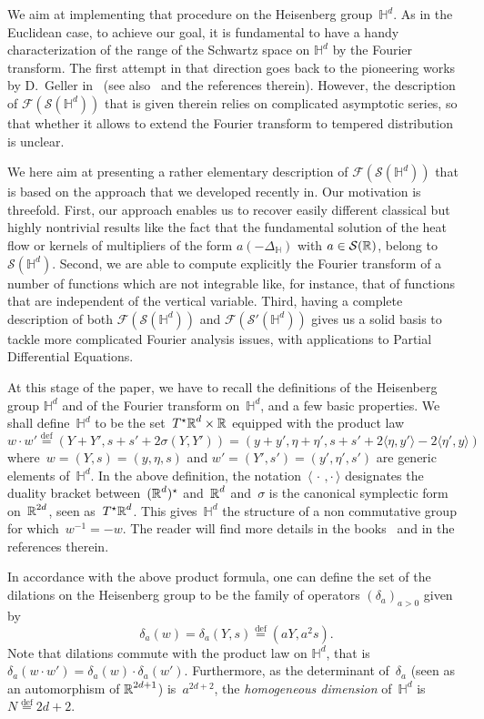 \documentclass[AHL,Unicode,longabstracts]{cedram}
\def\R{{\mathop{\mathbb R\kern 0pt}\nolimits}}
\newcommand*\bbH{\mathbb{H}}
\newcommand{\D}{\Delta}
\newcommand*\cF{\mathcal{F}}
\newcommand*\cS{\mathcal{S}}
\newcommand*\R{\mathbb{R}}
\newcommand*\bbH{\mathbb{H}}
\newcommand*\eqdefa{\overset{\mathrm{def}}{=}}
\begin{document}
We aim at implementing that procedure on the Heisenberg group~$\bbH^d$. As in the Euclidean case, to achieve our goal, it is fundamental to have a handy characterization of the range of the Schwartz space on $\bbH^d$ by the Fourier transform. The first attempt in that direction goes back to the pioneering works by D.~Geller in~\cite{geller, geller2} (see also~\cite{astengo2,F,thangavelu2} and the references therein). However, the description of $\cF(\cS(\bbH^d))$ that is given therein relies on complicated asymptotic series, so that whether it allows to extend the Fourier transform to tempered distribution is unclear.

We here aim at presenting a rather elementary description of $\cF(\cS(\bbH^d))$ that is based on the approach that we developed recently in\cite{bcdFHspace}. Our motivation is threefold. First, our approach enables us to recover easily different classical but highly nontrivial results like the fact that the fundamental solution of the heat flow or kernels of multipliers of the form $a(-\D_\bbH)$ with $a\in\cS(\R)$, belong to $\cS(\bbH^d)$. Second, we are able to compute explicitly the Fourier transform of a number of functions which are not integrable like, for instance, that of functions that are independent of the vertical variable. Third, having a complete description of both $\cF(\cS(\bbH^d))$ and $\cF(\cS'(\bbH^d))$ gives us a solid basis to tackle more complicated Fourier analysis issues, with applications to Partial Differential Equations.

At this stage of the paper, we have to recall the definitions of the Heisenberg group $\bbH^d$ and of the Fourier transform on~$\bbH^d$, and a few basic properties. We shall define~$\bbH^d$ to be the set~$T^\star\R^d \times\R$ equipped with the product law
\[
w\cdot w'\eqdefa
\left(Y+Y', s+s'+ 2\sigma(Y,Y')\right) = \left(y+y', \eta+\eta', s+s'+2 \langle \eta,y'\rangle -2\langle \eta',y\rangle\right)
\]
where~$w=(Y,s)=(y,\eta,s)$ and $w'=(Y',s')=(y',\eta',s')$ are generic elements of~$\bbH^d$. In the above definition, the notation~$\langle{\,\cdot\,,\cdot\,}\rangle$ designates the duality bracket between~$(\R^d)^\star $ and~$\R^d$ and~$\sigma$ is the canonical symplectic form on~$\R^{2d}$, seen as~$T^\star\R^d$. This gives~$\bbH^d$ the structure of a non commutative group for which~$w^{-1}=-w$. The reader will find more details in the books~\cite{bfg, farautharzallah, fisher, folland, follandstein, stein2, taylor1, thangavelu} and in the references therein.

In accordance with the above product formula, one can define the set of the dilations on the Heisenberg group to be the family of operators $(\delta_a)_{a>0}$ given by
\begin{equation}\label{defdilations}
\delta_a(w) = \delta_a (Y,s) \eqdefa (aY,a^2s).
\end{equation}
Note that dilations commute with the product law on $\bbH^d$, that is $\delta_a(w\cdot w') = \delta_a(w) \cdot \delta_a (w')$. Furthermore, as the determinant of~$\delta_a$ (seen as an automorphism of $\R^{2d+1}$) is~$a^{2d+2}$, the \emph{homogeneous dimension} of~$\bbH^d$ is~$N\eqdefa2d+2$.
\end{document}

